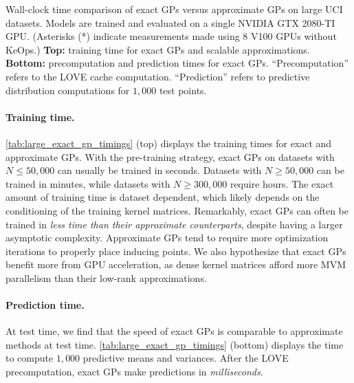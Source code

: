\begin{table}[t!]
  \vspace{1em}
  \caption[Wall-clock time of exact GPs versus approximate GPs.]{
    Wall-clock time comparison of exact GPs versus approximate GPs on large UCI datasets.
    Models are trained and evaluated on a single NVIDIA GTX 2080-TI GPU.
    (Asterisks (*) indicate measurements made using 8 V100 GPUs without KeOps.)
    {\bf Top:} training time for exact GPs and scalable approximations.
    {\bf Bottom:} precomputation and prediction times for exact GPs.
    ``Precomputation'' refers to the LOVE cache computation.
    ``Prediction'' refers to predictive distribution computations for $1,\!000$ test points.
  }
  \label{tab:large_exact_gp_timings}
  \centering
  \vspace{1em}

  \resizebox{\textwidth}{!}{%
    
  }
  \vspace{1em}

  \resizebox{\textwidth}{!}{%
    
  }

  \vspace{2em}
\end{table}


\paragraph{Training time.}
\cref{tab:large_exact_gp_timings} (top) displays the training times for exact and approximate GPs.
With the pre-training strategy, exact GPs on datasets with $N \leq 50,\!000$ can usually be trained in seconds.
Datasets with $N \geq 50,\!000$ can be trained in minutes, while datasets with $N \geq 300,\!000$ require hours.
The exact amount of training time is dataset dependent, which likely depends on the conditioning of the training kernel matrices.
Remarkably, exact GPs can often be trained in \emph{less time than their approximate counterparts}, despite having a larger asymptotic complexity.
Approximate GPs tend to require more optimization iterations to properly place inducing points.
We also hypothesize that exact GPs benefit more from GPU acceleration, as dense kernel matrices afford more MVM parallelism than their low-rank approximations.

\paragraph{Prediction time.}
At test time, we find that the speed of exact GPs is comparable to approximate methods at test time.
\cref{tab:large_exact_gp_timings} (bottom) displays the time to compute $1,\!000$ predictive means and variances.
After the LOVE precomputation, exact GPs make predictions in \emph{milliseconds}.

